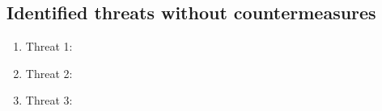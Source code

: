 \subsection{Identified threats without countermeasures}

	\begin{enumerate}
		\item Threat 1: 
		\item Threat 2:
		\item Threat 3:
	\end{enumerate}